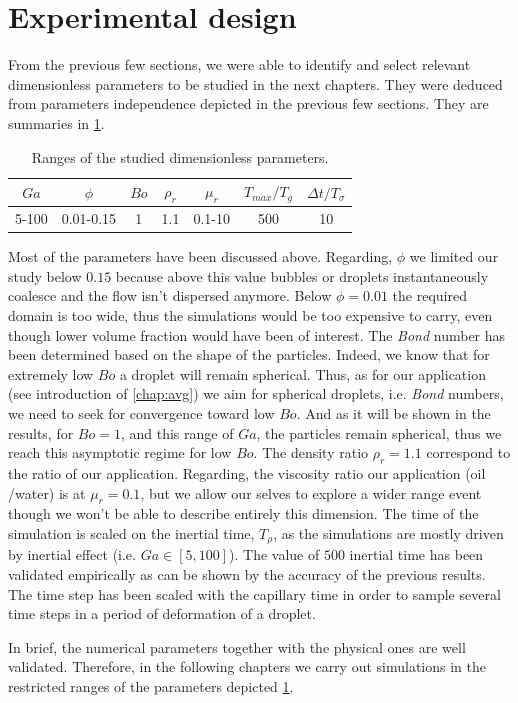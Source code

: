 \section{Experimental design}

From the previous few sections, we were able to identify and select relevant dimensionless parameters 
to be studied in the next chapters. 
They were deduced from parameters independence depicted in the previous few sections.
They are summaries in \ref{tab:parameters2}.
\begin{table}
    \caption{Ranges of the studied dimensionless parameters.}
    \centering
    \begin{tabular}{|c|c|c|c|c|c|c|} \hline
        $Ga$ &
        $\phi$ & 
        $Bo$ &
        $\rho_r$ &
        $\mu_r$ &
        $T_{max}/T_g$ &
        $\Delta t/T_{\sigma}$\\ \hline
        5-100
        &0.01-0.15
        & 1 
        & 1.1
        & 0.1-10
        & 500
        & 10 \\\hline
    \end{tabular}
    \label{tab:parameters2}
\end{table}
Most of the parameters have been discussed above. 
Regarding, $\phi$ we limited our study below $0.15$ because above this value bubbles or droplets instantaneously coalesce and the flow isn't dispersed anymore. 
Below $\phi =0.01$ the required domain is too wide, thus the simulations would be too expensive to carry, even though lower volume fraction would have been of interest. 
The \textit{Bond} number has been determined based on the shape of the particles. 
Indeed, we know that for extremely low $Bo$ a droplet will remain spherical. 
Thus, as for our application (see introduction of \ref{chap:avg}) we aim for spherical droplets, i.e. \textit{Bond} numbers, we need to seek for convergence toward low $Bo$. 
And as it will be shown in the results, for $Bo =1$, and this range of $Ga$, the particles remain spherical, thus we reach this asymptotic regime for low $Bo$. 
The density ratio $\rho_r = 1.1$ correspond to the ratio of our application. 
Regarding, the viscosity ratio our application (oil /water) is at $\mu_r=0.1$, but we allow our selves to explore a wider range event though we won't be able to describe entirely this dimension. 
The time of the simulation is scaled on the inertial time, $T_\rho$, as the simulations are mostly driven by inertial effect (i.e. $Ga \in [5,100]$). 
The value of $500$ inertial time has been validated empirically as can be shown by the accuracy of the previous results. 
The time step has been scaled with the capillary time in order to sample several time steps in a period of deformation of a droplet. 

In brief, the numerical parameters together with the physical ones are well validated.
Therefore, in the following chapters we carry out simulations in the restricted ranges of the parameters depicted \ref{tab:parameters2}.